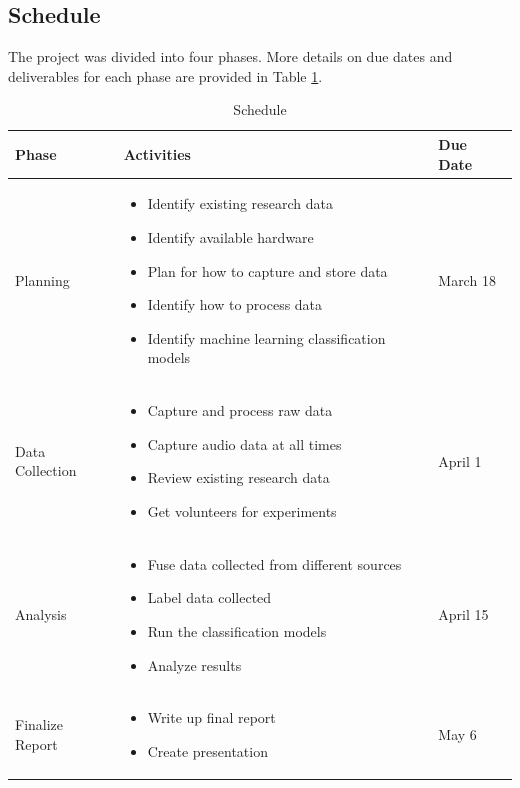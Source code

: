 \documentclass[conference]{IEEEtran}
\begin{document}
	\subsection{Schedule}
	The project was divided into four phases.
	More details on due dates and deliverables for each phase are provided in Table \ref{tab: Schedule}.
	
	\begin{table}[htbp]
		\caption{Schedule}
		\begin{center}
			\begin{tabular}{| m{1.2cm} | m{4cm} | m{1.2cm} |}
				\hline
				\textbf{Phase} & \textbf{Activities} & \textbf{Due Date} \\
				\hline
				Planning & 
				\begin{itemize}
					\item Identify existing research data
					\item Identify available hardware
					\item Plan for how to capture and store data
					\item Identify how to process data
					\item Identify machine learning classification models
				\end{itemize} &
				March 18 \\
				\hline
				
				Data Collection & 
				\begin{itemize}
					\item Capture and process raw data
					\item Capture audio data at all times
					\item Review existing research data
					\item Get volunteers for experiments
				\end{itemize} & 
				April 1 \\
				\hline
				
				Analysis & 
				\begin{itemize}
					\item Fuse data collected from different sources
					\item Label data collected
					\item Run the classification models
					\item Analyze results
				\end{itemize} & 
				April 15 \\
				\hline
				
				Finalize Report & 
				\begin{itemize}
					\item Write up final report
					\item Create presentation
				\end{itemize} & 
				May 6 \\
				\hline
			\end{tabular}
			\label{tab: Schedule}
		\end{center}
	\end{table}
	
\end{document}
